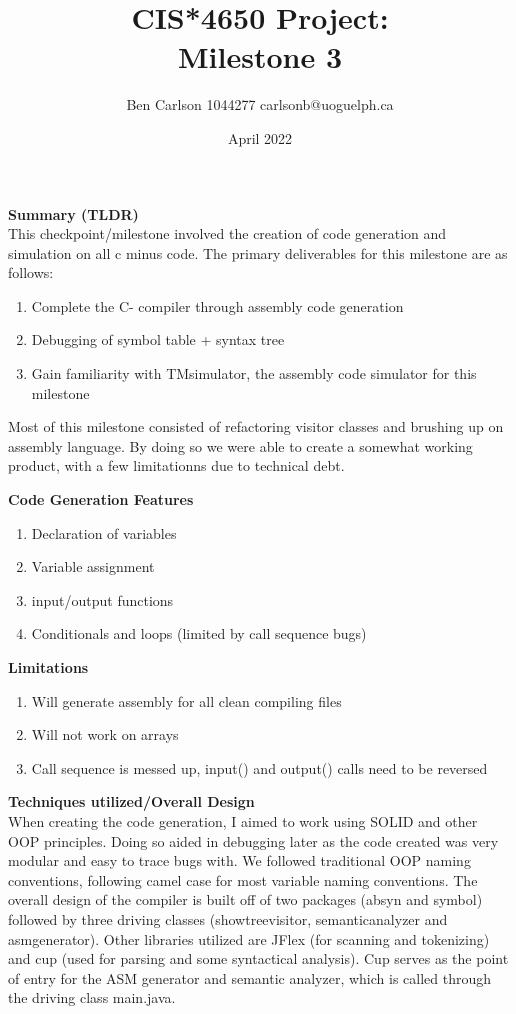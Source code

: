 \documentclass[12pt]{extarticle}
\title{CIS*4650 Project:\\ Milestone 3}
\author{
    Ben Carlson 1044277 carlsonb@uoguelph.ca \\
}
\date{April 2022}
\begin{document}
\maketitle
\pagebreak
\textbf{Summary (TLDR)}\\

This checkpoint/milestone involved the creation of code generation and simulation on all c minus code.
The primary deliverables for this milestone are as follows:

\begin{enumerate}
    \item Complete the C- compiler through assembly code generation
    \item Debugging of symbol table + syntax tree
    \item Gain familiarity with TMsimulator, the assembly code simulator for this milestone
\end{enumerate}

Most of this milestone consisted of refactoring visitor classes and brushing up on assembly language. By doing so we were able to create a somewhat working product, with a few limitationns due to technical debt.

\textbf{Code Generation Features} 
\begin{enumerate}
    \item Declaration of variables
    \item Variable assignment
    \item input/output functions
    \item Conditionals and loops (limited by call sequence bugs)
\end{enumerate}
\textbf{Limitations}
\begin{enumerate}
    \item Will generate assembly for all clean compiling files
    \item Will not work on arrays
    \item Call sequence is messed up, input() and output() calls need to be reversed
\end{enumerate}

\pagebreak

\textbf{Techniques utilized/Overall Design}
\\
When creating the code generation, I aimed to work using SOLID and other OOP principles. Doing so aided in debugging later as the code created was very modular and easy to trace bugs with. We followed traditional OOP naming conventions, following camel case for most variable naming conventions. The overall design of the compiler is built off of two packages (absyn and symbol) followed by three driving classes (showtreevisitor, semanticanalyzer and asmgenerator). Other libraries utilized are JFlex (for scanning and tokenizing) and cup (used for parsing and some syntactical analysis). Cup serves as the point of entry for the ASM generator and semantic analyzer, which is called through the driving class main.java. \\ 
\end{document}
